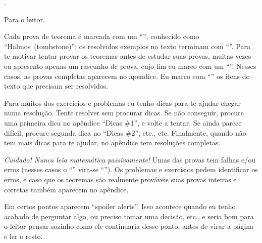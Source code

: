 
\chapteroid \prefacename.

\sectionoid Para o leitor.

Cada prova de teorema é marcada com um ``\thinspace\qedsymbol\thinspace'',
conhecido como ``Halmos\Halmos[tombstone]~(tombstone)'';
os resolvidos exemplos no texto terminam com ``\thinspace\qexsymbol\thinspace''.
Para te motivar tentar provar os teoremas antes de estudar suas provas,
muitas vezes eu apresento apenas um rascunho de prova,
cujo fim eu marco com um ``\thinspace\qessymbol\thinspace''.
Nesses casos, as provas completas aparecem no apendice.
Eu marco com ``\thinspace\activitysymbol\thinspace'' os itens do texto que
precisam ser resolvidos.

Para muitos dos exercícios e problemas eu tenho dicas para te ajudar
chegar numa resolução.  Tente resolver sem procurar dicas.
Se não conseguir, procure uma primeira dica no apêndice ``Dicas \#1'',
e volte a tentar.
Se ainda parece difícil, procure segunda dica no ``Dicas \#2'', etc., etc.
Finalmente, quando não tem mais dicas para te ajudar,
no apêndice tem resoluções completas.

\emph{Cuidado! Nunca leia matemática passivamente!}
Umas das provas tem falhas e/ou erros
(nesses casos o ``\thinspace\qedsymbol\thinspace''
vira-se ``\thinspace\mistakesymbol\thinspace'').
Os problemas e exercísios pedem identificar os erros,
e caso que os teoremas são realmente prováveis suas provas
inteiras e corretas também aparecem no apêndice.

Em certos pontos aparecem ``spoiler alerts''.
Isso acontece quando eu tenho acabado de perguntar algo, ou preciso
tomar uma decisão, etc., e seria bom para o leitor pensar sozinho
como ele continuaria desse ponto, antes de virar a página
e ler o resto.

\endsectionoid

\endchapteroid
